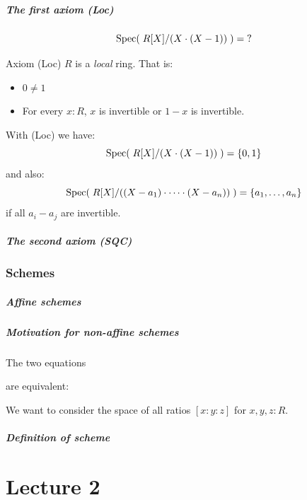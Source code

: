 \documentclass[aspectratio=1610]{beamer}
\begin{document}
\begin{frame}
  \frametitle{The first axiom (Loc)}

  \[ \operatorname{Spec}(\;R[X]/(X\cdot(X-1))\;) = \text{?} \]

  \pause%
  \bigskip
  \begin{block}{Axiom (Loc)}
    $R$ is a \emph{local} ring.
    That is:
    \begin{itemize}
      \item
        $0 \neq 1$
      \item
        For every $x : R$,
        $x$ is invertible or $1 - x$ is invertible.
    \end{itemize}
  \end{block}

  \bigskip
  With (Loc) we have:
  \[ \operatorname{Spec}(\;R[X]/(X\cdot(X-1))\;) = \{0, 1\} \]
  \pause%
  and also:
  \[ \operatorname{Spec}(\;R[X]/((X-a_1)\cdot \dots \cdot(X-a_n))\;) = \{a_1, \dots, a_n\} \]
  if all $a_i - a_j$ are invertible.
\end{frame}

\begin{frame}
  \frametitle{The second axiom (SQC)}
\end{frame}

\section{Schemes}

\begin{frame}
  \frametitle{Affine schemes}
\end{frame}

\begin{frame}
  \frametitle{Motivation for non-affine schemes}

  \begin{example}
    The two equations

    are equivalent:
  \end{example}

  We want to consider the space of all \alert{ratios} $[x : y : z]$
  for $x, y, z : R$.
\end{frame}

\begin{frame}
  \frametitle{Definition of scheme}
\end{frame}

\part{Lecture 2}
\end{document}
